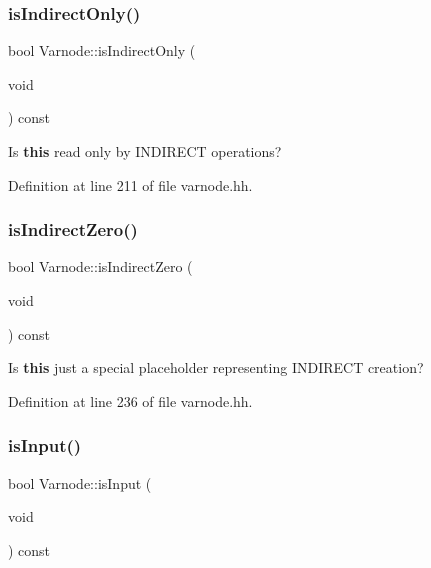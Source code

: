 \subsubsection{\texorpdfstring{isIndirectOnly()}{isIndirectOnly()}}
{\footnotesize\ttfamily bool Varnode\+::is\+Indirect\+Only (\begin{DoxyParamCaption}\item[{void}]{ }\end{DoxyParamCaption}) const\hspace{0.3cm}{\ttfamily [inline]}}



Is {\bfseries{this}} read only by I\+N\+D\+I\+R\+E\+CT operations? 



Definition at line 211 of file varnode.\+hh.

\mbox{\label{class_varnode_abba0a1aed3783ba8fdb8de79fcfe1708}} 
\subsubsection{\texorpdfstring{isIndirectZero()}{isIndirectZero()}}
{\footnotesize\ttfamily bool Varnode\+::is\+Indirect\+Zero (\begin{DoxyParamCaption}\item[{void}]{ }\end{DoxyParamCaption}) const\hspace{0.3cm}{\ttfamily [inline]}}



Is {\bfseries{this}} just a special placeholder representing I\+N\+D\+I\+R\+E\+CT creation? 



Definition at line 236 of file varnode.\+hh.

\mbox{\label{class_varnode_abfb9d8749d88eacbb2d5b61900afb4a2}} 
\subsubsection{\texorpdfstring{isInput()}{isInput()}}
{\footnotesize\ttfamily bool Varnode\+::is\+Input (\begin{DoxyParamCaption}\item[{void}]{ }\end{DoxyParamCaption}) const\hspace{0.3cm}{\ttfamily [inline]}}



